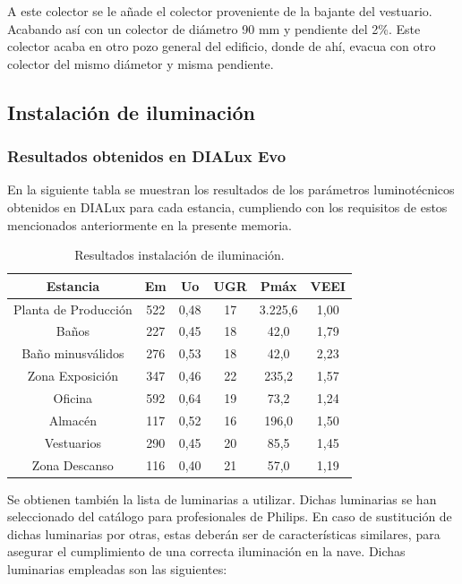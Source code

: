 \documentclass[../main.tex]{subfiles}
\begin{document}
A este colector se le añade el colector proveniente de la bajante del vestuario. Acabando así con un colector de diámetro 90 mm y pendiente del 2\%. Este colector acaba en otro pozo general del edificio, donde de ahí, evacua con otro colector del mismo diámetor y misma pendiente.

\subsection{Instalación de iluminación}
\subsubsection{Resultados obtenidos en DIALux Evo}
En la siguiente tabla se muestran los resultados de los parámetros luminotécnicos obtenidos en DIALux para cada estancia, cumpliendo con los requisitos de estos mencionados anteriormente en la presente memoria.

\begin{table}[H]
    \centering
    \begin{tabular}{c | c | c | c | c | c}
         Estancia & Em & Uo & UGR & Pmáx & VEEI \\ \hline
         Planta de Producción & 522 & 0,48 & 17 & 3.225,6 & 1,00\\ 
         Baños & 227 & 0,45 & 18 & 42,0 & 1,79 \\ 
         Baño minusválidos & 276 & 0,53 & 18 & 42,0 & 2,23\\ 
         Zona Exposición & 347 & 0,46 & 22 & 235,2 & 1,57 \\ 
         Oficina & 592 & 0,64 & 19 & 73,2 & 1,24 \\ 
         Almacén & 117 & 0,52 & 16 & 196,0 & 1,50 \\ 
         Vestuarios & 290 & 0,45 & 20 & 85,5 & 1,45 \\ 
         Zona Descanso & 116 & 0,40 & 21 & 57,0 & 1,19
    \end{tabular}
    \caption{Resultados instalación de iluminación.}
\end{table}

Se obtienen también la lista de luminarias a utilizar. Dichas luminarias se han seleccionado del catálogo para profesionales de Philips. En caso de sustitución de dichas luminarias por otras, estas deberán ser de características similares, para asegurar el cumplimiento de una correcta iluminación en la nave. Dichas luminarias empleadas son las siguientes:
\end{document}
